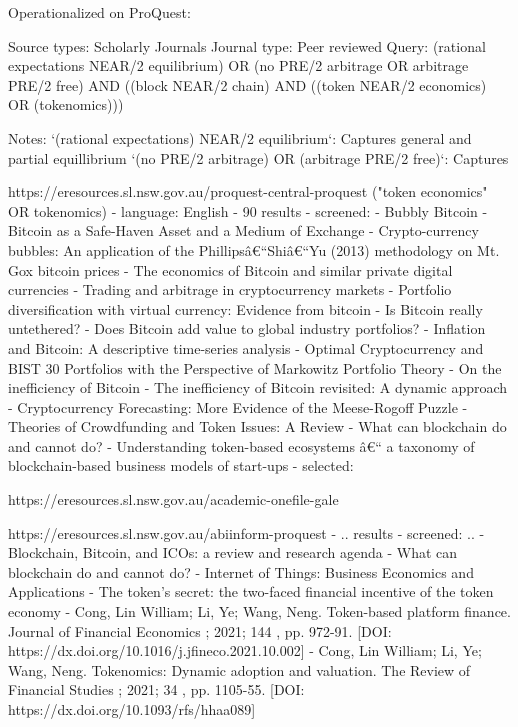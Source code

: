\documentclass[11pt]{article}
\begin{document}
Operationalized on ProQuest:

Source types: Scholarly Journals
Journal type: Peer reviewed
Query: (rational expectations NEAR/2 equilibrium) OR (no PRE/2 arbitrage OR arbitrage PRE/2 free) AND ((block NEAR/2 chain) AND ((token NEAR/2 economics) OR (tokenomics)))

Notes:
`(rational expectations) NEAR/2 equilibrium`: Captures general and partial equillibrium
`(no PRE/2 arbitrage) OR (arbitrage PRE/2 free)`: Captures 

https://eresources.sl.nsw.gov.au/proquest-central-proquest
 ("token economics" OR tokenomics) 
 - language: English
 - 90 results
 - screened: 
   - Bubbly Bitcoin
   - Bitcoin as a Safe-Haven Asset and a Medium of Exchange
   - Crypto-currency bubbles: An application of the Phillipsâ€“Shiâ€“Yu (2013) methodology on Mt. Gox bitcoin prices
   - The economics of Bitcoin and similar private digital currencies
   - Trading and arbitrage in cryptocurrency markets
   - Portfolio diversification with virtual currency: Evidence from bitcoin
   - Is Bitcoin really untethered?
   - Does Bitcoin add value to global industry portfolios?
   - Inflation and Bitcoin: A descriptive time-series analysis
   - Optimal Cryptocurrency and BIST 30 Portfolios with the Perspective of Markowitz Portfolio Theory
   - On the inefficiency of Bitcoin
   - The inefficiency of Bitcoin revisited: A dynamic approach
   - Cryptocurrency Forecasting: More Evidence of the Meese-Rogoff Puzzle
   - Theories of Crowdfunding and Token Issues: A Review
   - What can blockchain do and cannot do?
   - Understanding token-based ecosystems â€“ a taxonomy of blockchain-based business models of start-ups
 - selected: 

https://eresources.sl.nsw.gov.au/academic-onefile-gale

https://eresources.sl.nsw.gov.au/abiinform-proquest
 - .. results
   - screened: ..
     - Blockchain, Bitcoin, and ICOs: a review and research agenda
     - What can blockchain do and cannot do?
     - Internet of Things: Business Economics and Applications
     - The token's secret: the two-faced financial incentive of the token economy
     - Cong, Lin William; Li, Ye; Wang, Neng. Token-based platform finance. Journal of Financial Economics ; 2021; 144 , pp. 972-91. [DOI: https://dx.doi.org/10.1016/j.jfineco.2021.10.002]
     - Cong, Lin William; Li, Ye; Wang, Neng. Tokenomics: Dynamic adoption and valuation. The Review of Financial Studies ; 2021; 34 , pp. 1105-55. [DOI: https://dx.doi.org/10.1093/rfs/hhaa089]
     
\end{document}
